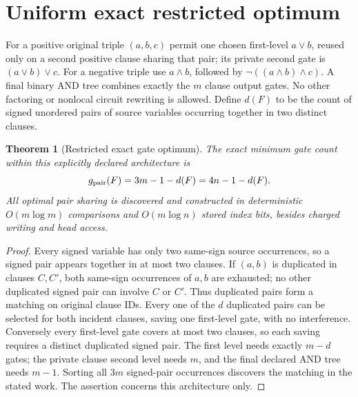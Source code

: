 \documentclass[11pt]{article}
\newtheorem{theorem}{Theorem}
\begin{document}
\section{Uniform exact restricted optimum}
For a positive original triple $(a,b,c)$ permit one chosen first-level $a\lor b$, reused only on a second positive clause sharing that pair; its private second gate is $(a\lor b)\lor c$. For a negative triple use $a\land b$, followed by $\neg((a\land b)\land c)$. A final binary AND tree combines exactly the $m$ clause output gates. No other factoring or nonlocal circuit rewriting is allowed. Define $d(F)$ to be the count of signed unordered pairs of source variables occurring together in two distinct clauses.
\begin{theorem}[Restricted exact gate optimum]
The exact minimum gate count within this explicitly declared architecture is
\[
  g_{\rm pair}(F)=3m-1-d(F)=4n-1-d(F).
\]
All optimal pair sharing is discovered and constructed in deterministic $O(m\log m)$ comparisons and $O(m\log n)$ stored index bits, besides charged writing and head access.
\end{theorem}
\begin{proof}
Every signed variable has only two same-sign source occurrences, so a signed pair appears together in at most two clauses. If $(a,b)$ is duplicated in clauses $C,C'$, both same-sign occurrences of $a,b$ are exhausted; no other duplicated signed pair can involve $C$ or $C'$. Thus duplicated pairs form a matching on original clause IDs. Every one of the $d$ duplicated pairs can be selected for both incident clauses, saving one first-level gate, with no interference. Conversely every first-level gate covers at most two clauses, so each saving requires a distinct duplicated signed pair. The first level needs exactly $m-d$ gates; the private clause second level needs $m$, and the final declared AND tree needs $m-1$. Sorting all $3m$ signed-pair occurrences discovers the matching in the stated work. The assertion concerns this architecture only.
\end{proof}
\end{document}
